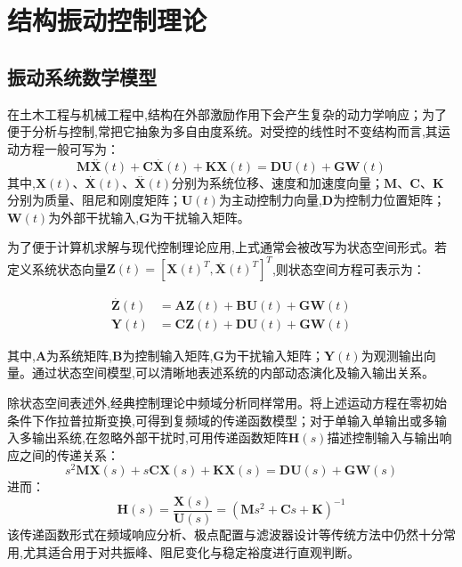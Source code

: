 \documentclass{scrbook}
\begin{document}
{\section{\label{ref-017}结构振动控制理论\label{mark-2.1}}

\subsection{\label{ref-018}振动系统数学模型\label{mark-2.1.1}}

在土木工程与机械工程中,结构在外部激励作用下会产生复杂的动力学响应；为了便于分析与控制,常把它抽象为多自由度系统。对受控的线性时不变结构而言,其运动方程一般可写为：
\begin{equation}
\tag{2-1}
\mathbf{M}\overset{..}{\mathbf{X}}(t)+\mathbf{C}\overset{.}{\mathbf{X}}(t)+\mathbf{KX}(t)=\mathbf{DU}(t)+\mathbf{GW}(t)
\end{equation}
其中,$\mathbf{X}(t)$、$\overset{.}{\mathbf{X}}(t)$、$\overset{..}{\mathbf{X}}(t)$分别为系统位移、速度和加速度向量；$\mathbf{M}$、$\mathbf{C}$、$\mathbf{K}$分别为质量、阻尼和刚度矩阵；$\mathbf{U}(t)$为主动控制力向量,$\mathbf{D}$为控制力位置矩阵；$\mathbf{W}(t)$为外部干扰输入,$\mathbf{G}$为干扰输入矩阵。

为了便于计算机求解与现代控制理论应用,上式通常会被改写为状态空间形式。若定义系统状态向量$\mathbf{Z}(t)=[\mathbf{X}(t)^{T},\overset{.}{\mathbf{X}}(t)^{T}]^{T}$,则状态空间方程可表示为：

\begin{align}
\tag{2-2}
\overset{.}{\mathbf{Z}}(t)&=\mathbf{AZ}(t)+\mathbf{BU}(t)+\mathbf{GW}(t) \\
\tag{2-3}
\mathbf{Y}(t)&=\mathbf{CZ}(t)+\mathbf{DU}(t)+\mathbf{GW}(t) 
\end{align}

其中,$\mathbf{A}$为系统矩阵,$\mathbf{B}$为控制输入矩阵,$\mathbf{G}$为干扰输入矩阵；$\mathbf{Y}(t)$为观测输出向量。通过状态空间模型,可以清晰地表述系统的内部动态演化及输入输出关系。

除状态空间表述外,经典控制理论中频域分析同样常用。将上述运动方程在零初始条件下作拉普拉斯变换,可得到复频域的传递函数模型；对于单输入单输出或多输入多输出系统,在忽略外部干扰时,可用传递函数矩阵$\mathbf{H}(s)$描述控制输入与输出响应之间的传递关系：
\begin{equation}
\tag{2-4}
s^{2}\mathbf{MX}(s)+s\mathbf{CX}(s)+\mathbf{KX}(s)=\mathbf{DU}(s)+\mathbf{GW}(s)
\end{equation}
进而：
\begin{equation}
\tag{2-5}
\mathbf{H}(s)=\frac{\mathbf{X}(s)}{\mathbf{U}(s)}=(\mathbf{M}s^{2}+\mathbf{C}s+\mathbf{K})^{-1}
\end{equation}
该传递函数形式在频域响应分析、极点配置与滤波器设计等传统方法中仍然十分常用,尤其适合用于对共振峰、阻尼变化与稳定裕度进行直观判断。

}
\end{document}
